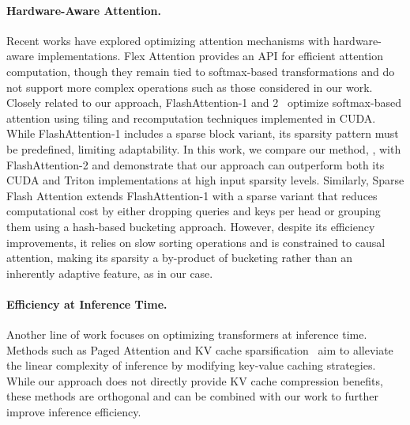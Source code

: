 \paragraph{Hardware-Aware Attention.} Recent works have explored optimizing attention mechanisms with hardware-aware implementations. Flex Attention \citep{dong2024flexattentionprogrammingmodel} provides an API for efficient attention computation, though they remain tied to softmax-based transformations and do not support more complex operations such as those considered in our work. 
Closely related to our approach, FlashAttention-1 and 2~\citep{dao2022flashattention,dao2023flashattention2} optimize softmax-based attention using tiling and recomputation techniques implemented in CUDA. While FlashAttention-1 includes a sparse block variant, its sparsity pattern must be predefined, limiting adaptability. In this work, we compare our method, \methodname, with FlashAttention-2 and demonstrate that our approach can outperform both its CUDA and Triton implementations at high input sparsity levels.
Similarly, Sparse Flash Attention \citep{pagliardini2023fast} extends FlashAttention-1 with a sparse variant that reduces computational cost by either dropping queries and keys per head or grouping them using a hash-based bucketing approach.
However, despite its efficiency improvements, it relies on slow sorting operations and is constrained to causal attention, making its sparsity a by-product of bucketing rather than an inherently adaptive feature, as in our case.

\paragraph{Efficiency at Inference Time.} Another line of work focuses on optimizing transformers at inference time. Methods such as Paged Attention \citep{kwon2023efficient} and KV cache sparsification~\citep{devoto-etal-2024-simple,luohe2024keep} aim to alleviate the linear complexity of inference by modifying key-value caching strategies. While our approach does not directly provide KV cache compression benefits, these methods are orthogonal and can be combined with our work to further improve inference efficiency.